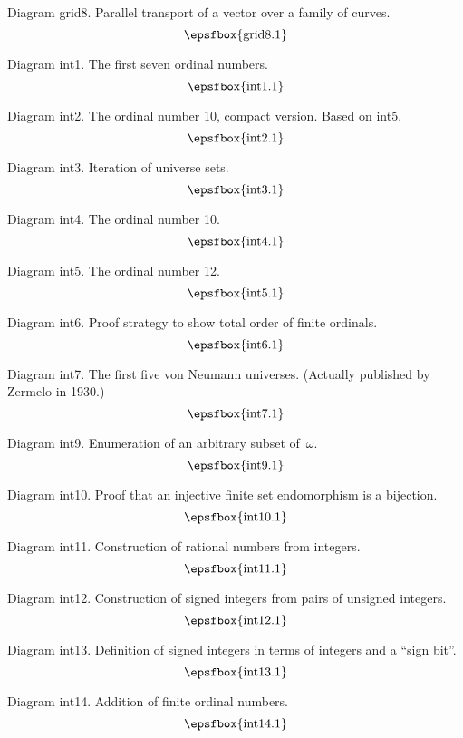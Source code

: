 Diagram grid8. Parallel transport of a vector over a family of curves.
$$
\centerline{\epsfbox{grid8.1}}
$$

\secteject
\edef\SECTint{\the\pageno}

Diagram int1. The first seven ordinal numbers.
$$
\centerline{\epsfbox{int1.1}}
$$

Diagram int2. The ordinal number 10, compact version. Based on int5.
$$
\centerline{\epsfbox{int2.1}}
$$

Diagram int3. Iteration of universe sets.
$$
\centerline{\epsfbox{int3.1}}
$$

\filleject

Diagram int4. The ordinal number 10.
$$
\centerline{\epsfbox{int4.1}}
$$

\filleject

Diagram int5. The ordinal number 12.
$$
\centerline{\epsfbox{int5.1}}
$$

\filleject

Diagram int6. Proof strategy to show total order of finite ordinals.
$$
\centerline{\epsfbox{int6.1}}
$$

Diagram int7. The first five von Neumann universes. (Actually published by
Zermelo in 1930.)
$$
\centerline{\epsfbox{int7.1}}
$$

Diagram int9. Enumeration of an arbitrary subset of~$\omega$.
$$
\centerline{\epsfbox{int9.1}}
$$

Diagram int10. Proof that an injective finite set endomorphism is a bijection.
$$
\centerline{\epsfbox{int10.1}}
$$

\filleject

Diagram int11. Construction of rational numbers from integers.
$$
\centerline{\epsfbox{int11.1}}
$$

Diagram int12. Construction of signed integers from pairs of unsigned integers.
$$
\centerline{\epsfbox{int12.1}}
$$

Diagram int13. Definition of signed integers in terms of integers and a ``sign
bit''.
$$
\centerline{\epsfbox{int13.1}}
$$

Diagram int14. Addition of finite ordinal numbers.
$$
\centerline{\epsfbox{int14.1}}
$$

